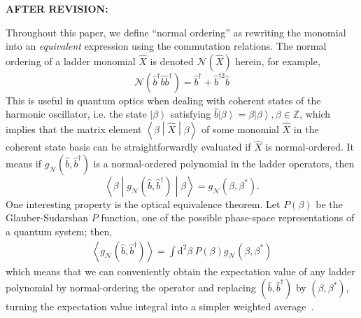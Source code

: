 \documentclass[12pt, a4paper]{article}
\newcommand{\matrixel}[3]{\left\langle{#1}\middle|{#2}\middle|{#3}\right\rangle}
\newcommand{\ket}[1]{\left|{#1}\right\rangle}
\newcommand{\expval}[1]{\left\langle{#1}\right\rangle}
\newcommand{\bop}{\hat{b}}
\newcommand{\bdag}{\bop^\dagger}
\newcommand{\bdagn}[1]{\bop^{\dagger {#1}}}
\newenvironment{revision}{%
\color{red}
}
{}
\newenvironment{revpost}{%
\textbf{{AFTER REVISION:}}
\par
}
{}
\begin{document}
\begin{revpost}
\begin{revision}
Throughout this paper, we define ``normal ordering'' as rewriting the monomial into an \emph{equivalent} expression using the commutation relations. The normal ordering of a ladder monomial $\hat{X}$ is denoted $\mathcal{N}\left(\hat{X}\right)$ herein, for example,
\setcounter{equation}{14}
\begin{equation}
    \mathcal{N}\left(\bdag\bop\bdag\right) = \bdag+\bdagn{2}\bop
\end{equation}
This is useful in quantum optics when dealing with coherent states of the harmonic oscillator, i.e. the state $\ket{\beta}$ satisfying $\bop\ket{\beta} = \beta\ket{\beta}, \beta\in\mathbb{Z}$, which implies that the matrix element $\matrixel{\beta}{\hat{X}}{\beta}$ of some monomial $\hat{X}$ in the coherent state basis can be straightforwardly evaluated if $\hat{X}$ is normal-ordered. It means if $g_\mathcal{N}\left(\bop,\bdag\right)$ is a normal-ordered polynomial in the ladder operators, then
\begin{equation}
    \matrixel{\beta}{g_\mathcal{N}\left(\bop,\bdag\right)}{\beta} = g_\mathcal{N}\left(\beta,\beta^*\right) .
\end{equation}
One interesting property is the optical equivalence theorem. Let $P(\beta)$ be the Glauber-Sudarshan $P$ function, one of the possible phase-space representations of a quantum system; then,
\begin{equation}\begin{split}
    \expval{g_\mathcal{N}\left(\bop,\bdag\right)} = \int \mathrm{d}^2\beta\ P\left(\beta\right)g_\mathcal{N}\left(\beta,\beta^*\right)
\end{split}\end{equation}
which means that we can conveniently obtain the expectation value of any ladder polynomial by normal-ordering the operator and replacing $\left(\bop,\bdag\right)$ by $\left(\beta,\beta^*\right)$, turning the expectation value integral into a simpler weighted average~\cite[Chapter 3]{gerry_introductory_2005}.
\end{revision}

\end{revpost}


\newpage
{}



\end{document}
